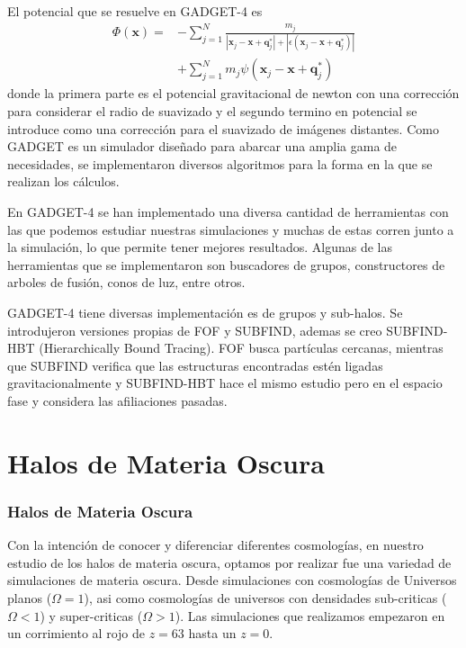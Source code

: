 \documentclass{beamer}
\begin{document}
	
	\begin{frame}
		El potencial que se resuelve en GADGET-4 es 
		\begin{align}
    \Phi (\textbf{x}) = &- \sum_{j=1}^{N} \frac{m_j}{|\textbf{x}_j-\textbf{x}+\textbf{q}^*_j| + |\epsilon(\textbf{x}_j-\textbf{x}+\textbf{q}^*_j)|} \nonumber \\
    &+ \sum_{j=1}^{N} m_j \psi (\textbf{x}_j-\textbf{x}+\textbf{q}^*_j) \label{eq:Pot}
\end{align}
		donde la primera parte es el potencial gravitacional de newton con una corrección para considerar el radio de suavizado y el segundo termino en potencial se introduce como una corrección para el suavizado de imágenes distantes. Como GADGET es un simulador diseñado para abarcar una amplia gama de necesidades, se implementaron diversos algoritmos para la forma en la que se realizan los cálculos.
	\end{frame}
	
	\begin{frame}
		En GADGET-4 se han implementado una diversa cantidad de herramientas con las que podemos estudiar nuestras simulaciones y muchas de estas corren junto a la simulación, lo que permite tener mejores resultados. Algunas de las herramientas que se implementaron son buscadores de grupos, constructores de arboles de fusión, conos de luz, entre otros.
	\end{frame}
	
	\begin{frame}
		GADGET-4 tiene diversas implementación es de grupos y sub-halos. Se introdujeron versiones propias de FOF y SUBFIND, ademas se creo SUBFIND-HBT (Hierarchically Bound Tracing). FOF busca partículas cercanas, mientras que SUBFIND verifica que las estructuras encontradas estén ligadas gravitacionalmente y SUBFIND-HBT hace el mismo estudio pero en el espacio fase y considera las afiliaciones pasadas.
	
	\end{frame}


\section{Halos de Materia Oscura}
\setcounter{equation}{0}
	\begin{frame}
		\frametitle{Halos de Materia Oscura}
		Con la intención de conocer y diferenciar diferentes cosmologías, en nuestro estudio de los halos de materia oscura, optamos por realizar fue una variedad de simulaciones de materia oscura. Desde simulaciones con cosmologías de Universos planos ($\Omega=1$), asi como cosmologías de universos con densidades sub-criticas ($\Omega < 1$) y super-criticas ($\Omega > 1$). Las simulaciones que realizamos empezaron en un corrimiento al rojo de $z = 63$ hasta un $z = 0$.
		
	\end{frame}
\end{document}
